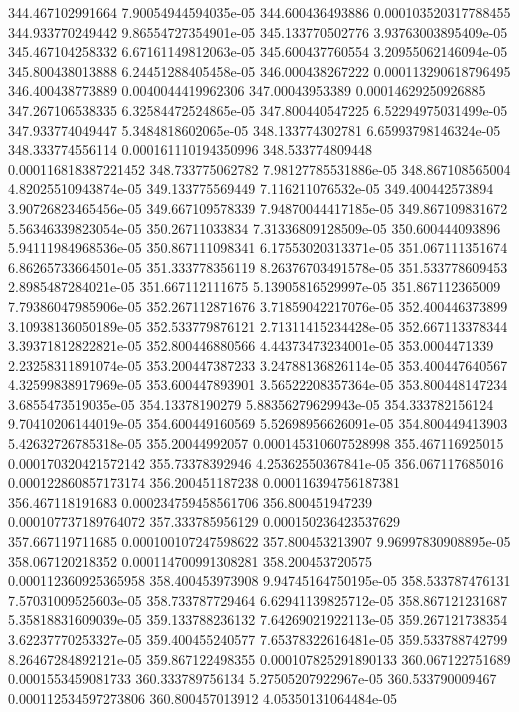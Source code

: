 {344.467102991664 7.90054944594035e-05
344.600436493886 0.000103520317788455
344.933770249442 9.86554727354901e-05
345.133770502776 3.93763003895409e-05
345.467104258332 6.67161149812063e-05
345.600437760554 3.20955062146094e-05
345.800438013888 6.24451288405458e-05
346.000438267222 0.000113290618796495
346.400438773889 0.0040044419962306
347.00043953389 0.00014629250926885
347.267106538335 6.32584472524865e-05
347.800440547225 6.52294975031499e-05
347.933774049447 5.3484818602065e-05
348.133774302781 6.65993798146324e-05
348.333774556114 0.000161110194350996
348.533774809448 0.000116818387221452
348.733775062782 7.98127785531886e-05
348.867108565004 4.82025510943874e-05
349.133775569449 7.116211076532e-05
349.400442573894 3.90726823465456e-05
349.667109578339 7.94870044417185e-05
349.867109831672 5.56346339823054e-05
350.26711033834 7.31336809128509e-05
350.600444093896 5.94111984968536e-05
350.867111098341 6.17553020313371e-05
351.067111351674 6.86265733664501e-05
351.333778356119 8.26376703491578e-05
351.533778609453 2.8985487284021e-05
351.667112111675 5.13905816529997e-05
351.867112365009 7.79386047985906e-05
352.267112871676 3.71859042217076e-05
352.400446373899 3.10938136050189e-05
352.533779876121 2.71311415234428e-05
352.667113378344 3.39371812822821e-05
352.800446880566 4.44373473234001e-05
353.0004471339 2.23258311891074e-05
353.200447387233 3.24788136826114e-05
353.400447640567 4.32599838917969e-05
353.600447893901 3.56522208357364e-05
353.800448147234 3.6855473519035e-05
354.13378190279 5.88356279629943e-05
354.333782156124 9.70410206144019e-05
354.600449160569 5.52698956626091e-05
354.800449413903 5.42632726785318e-05
355.20044992057 0.000145310607528998
355.467116925015 0.000170320421572142
355.73378392946 4.25362550367841e-05
356.067117685016 0.000122860857173174
356.200451187238 0.000116394756187381
356.467118191683 0.000234759458561706
356.800451947239 0.000107737189764072
357.333785956129 0.000150236423537629
357.667119711685 0.000100107247598622
357.800453213907 9.96997830908895e-05
358.067120218352 0.000114700991308281
358.200453720575 0.000112360925365958
358.400453973908 9.94745164750195e-05
358.533787476131 7.57031009525603e-05
358.733787729464 6.62941139825712e-05
358.867121231687 5.35818831609039e-05
359.133788236132 7.64269021922113e-05
359.267121738354 3.62237770253327e-05
359.400455240577 7.65378322616481e-05
359.533788742799 8.26467284892121e-05
359.867122498355 0.000107825291890133
360.067122751689 0.0001553459081733
360.333789756134 5.27505207922967e-05
360.533790009467 0.000112534597273806
360.800457013912 4.05350131064484e-05
}

